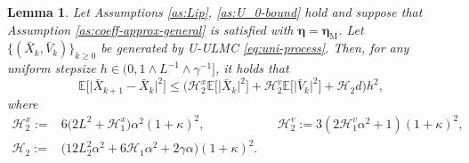 \documentclass[12pt]{article}
\numberwithin{equation}{section}
\renewcommand{\H}{\mathcal{H}}
\newtheorem{lem}{Lemma}[section]
\begin{document}
\begin{lem}\label{lem:delta-x-k+1}
Let Assumptions \ref{as:Lip}, \ref{as:U_0-bound} hold and suppose that Assumption \ref{as:coeff-approx-general} is satisfied with $\boldsymbol{\eta}=\boldsymbol{\eta}_{\mathrm M}$. Let $\{(\bar{X}_k,\bar{V}_k)\}_{k\geq0}$ be generated by U-ULMC \eqref{eq:uni-process}. Then, for any uniform stepsize $h\in(0,
1  
\wedge 
L^{-1}
\wedge
\gamma^{-1}]$, it holds that
\begin{equation}\label{eq:X-increment-bound}
\mathbb{E}
\Big[
\big|
\bar{X}_{k+1}
-
\bar{X}_{k}
\big|^2
\Big]
\leq
\Big(
\H^{x}_2
\mathbb{E}
\Big[
\big|
\bar{X}_k
\big|^2
\Big]
+
\H^{v}_2
\mathbb{E}
\Big[
\big|
\bar{V}_k
\big|^2
\Big]
+
\H_2
d
\Big)h^2,
\end{equation}
where
\begin{equation}
\begin{aligned}
\H^{x}_2
:=   & 
6
\big(
2L^2 +  \H^{x}_1
\big)
\alpha^2
(1+\kappa)^2,
&&
\H^{v}_2
:=  
3 (2 \H^{v}_1 
\alpha^2+
1)
(1+\kappa)^2,
\\ 
\H_2
:=   & 
\big(
12 L_2^2 \alpha^2 +  6 \H_1 \alpha^2
+
2\gamma  \alpha
\big)
(1+\kappa)^2
.
\end{aligned}
\end{equation}
\end{lem}
\end{document}
